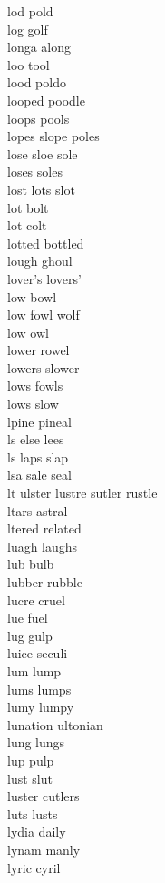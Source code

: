 lod pold \\
log golf \\
longa along\\
loo tool \\
lood poldo \\
looped poodle\\
loops pools\\
lopes slope poles\\
lose sloe sole\\
loses soles\\
lost lots slot\\
lot bolt \\
lot colt \\
lotted bottled \\
lough ghoul\\
lover's lovers'\\
low bowl \\
low fowl wolf \\
low owl\\
lower rowel\\
lowers slower\\
lows fowls \\
lows slow\\
lpine pineal \\
ls else lees  \\
ls laps slap  \\
lsa sale seal \\
lt ulster lustre sutler rustle    \\
ltars astral \\
ltered related \\
luagh laughs \\
lub bulb \\
lubber rubble\\
lucre cruel\\
lue fuel \\
lug gulp \\
luice seculi \\
lum lump \\
lums lumps \\
lumy lumpy \\
lunation ultonian\\
lung lungs \\
lup pulp \\
lust slut\\
luster cutlers \\
luts lusts \\
lydia daily\\
lynam manly\\
lyric cyril\\

